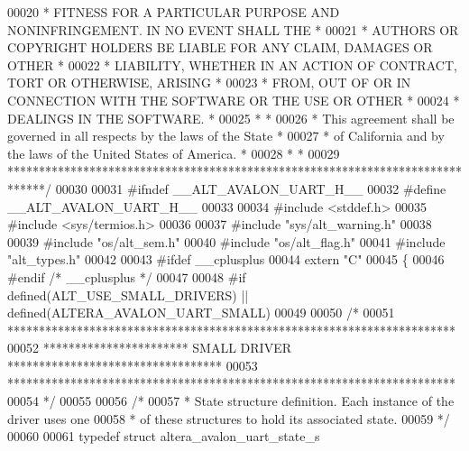 \begin{DoxyCode}
00020 \textcolor{comment}{* FITNESS FOR A PARTICULAR PURPOSE AND NONINFRINGEMENT. IN NO EVENT SHALL THE *}
00021 \textcolor{comment}{* AUTHORS OR COPYRIGHT HOLDERS BE LIABLE FOR ANY CLAIM, DAMAGES OR OTHER      *}
00022 \textcolor{comment}{* LIABILITY, WHETHER IN AN ACTION OF CONTRACT, TORT OR OTHERWISE, ARISING     *}
00023 \textcolor{comment}{* FROM, OUT OF OR IN CONNECTION WITH THE SOFTWARE OR THE USE OR OTHER         *}
00024 \textcolor{comment}{* DEALINGS IN THE SOFTWARE.                                                   *}
00025 \textcolor{comment}{*                                                                             *}
00026 \textcolor{comment}{* This agreement shall be governed in all respects by the laws of the State   *}
00027 \textcolor{comment}{* of California and by the laws of the United States of America.              *}
00028 \textcolor{comment}{*                                                                             *}
00029 \textcolor{comment}{******************************************************************************/}
00030 
00031 \textcolor{preprocessor}{#ifndef \_\_ALT\_AVALON\_UART\_H\_\_}
00032 \textcolor{preprocessor}{#define \_\_ALT\_AVALON\_UART\_H\_\_}
00033 
00034 \textcolor{preprocessor}{#include <stddef.h>}
00035 \textcolor{preprocessor}{#include <sys/termios.h>}
00036 
00037 \textcolor{preprocessor}{#include "sys/alt_warning.h"}
00038 
00039 \textcolor{preprocessor}{#include "os/alt_sem.h"}
00040 \textcolor{preprocessor}{#include "os/alt_flag.h"}
00041 \textcolor{preprocessor}{#include "alt_types.h"}
00042 
00043 \textcolor{preprocessor}{#ifdef \_\_cplusplus}
00044 \textcolor{keyword}{extern} \textcolor{stringliteral}{"C"}
00045 \{
00046 \textcolor{preprocessor}{#endif }\textcolor{comment}{/* \_\_cplusplus */}\textcolor{preprocessor}{}
00047 
00048 \textcolor{preprocessor}{#if defined(ALT\_USE\_SMALL\_DRIVERS) || defined(ALTERA\_AVALON\_UART\_SMALL)}
00049 
00050 \textcolor{comment}{/*}
00051 \textcolor{comment}{ ***********************************************************************}
00052 \textcolor{comment}{ *********************** SMALL DRIVER **********************************}
00053 \textcolor{comment}{ ***********************************************************************}
00054 \textcolor{comment}{ */}
00055 
00056 \textcolor{comment}{/*}
00057 \textcolor{comment}{ * State structure definition. Each instance of the driver uses one}
00058 \textcolor{comment}{ * of these structures to hold its associated state.}
00059 \textcolor{comment}{ */}
00060 
00061 \textcolor{keyword}{typedef} \textcolor{keyword}{struct }altera_avalon_uart_state_s

\end{DoxyCode}
